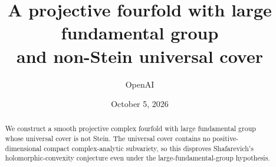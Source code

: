 \documentclass[11pt,reqno]{amsart}
\title[Large fundamental group and non-Stein universal cover]{A projective fourfold with large fundamental group\protect\\
and non-Stein universal cover}
\author{OpenAI}
\date{October 5, 2026}
\begin{document}
\begin{abstract}
We construct a smooth projective complex fourfold with large fundamental group
whose universal cover is not Stein. The universal cover contains no
positive-dimensional compact complex-analytic subvariety, so this disproves
Shafarevich's holomorphic-convexity conjecture even under the
large-fundamental-group hypothesis.
\end{abstract}
\maketitle
\tableofcontents









\end{document}
